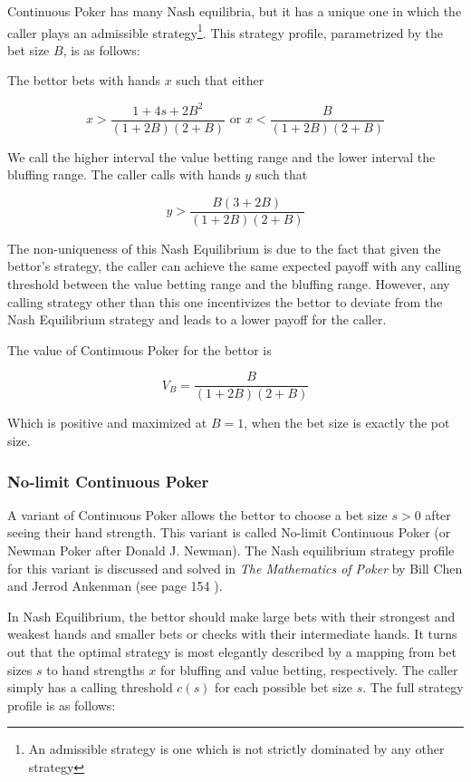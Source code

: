 \documentclass[a4paper,12pt]{article}
\theoremstyle{plain}
\theoremstyle{definition}
\begin{document}
Continuous Poker has many Nash equilibria, but it has a unique one in which the caller plays an admissible strategy\footnote{An admissible strategy is one which is not strictly dominated by any other strategy}. This strategy profile, parametrized by the bet size $B$, is as follows:

The bettor bets with hands $x$ such that either 

$$x > \frac{1 + 4s + 2B^2}{(1+2B)(2+B)} \text{ or } x < \frac{B}{(1+2B)(2+B)}$$

We call the higher interval the value betting range and the lower interval the bluffing range. The caller calls with hands $y$ such that

$$ y > \frac{B(3 +2B)}{(1+2B)(2+B)} $$

The non-uniqueness of this Nash Equilibrium is due to the fact that given the bettor's strategy, the caller can achieve the same expected payoff with any calling threshold between the value betting range and the bluffing range. However, any calling strategy other than this one incentivizes the bettor to deviate from the Nash Equilibrium strategy and leads to a lower payoff for the caller. 

The value of Continuous Poker for the bettor is 

$$ V_B = \frac{B}{(1+2B)(2+B)} $$

Which is positive and maximized at $B = 1$, when the bet size is exactly the pot size. 

\subsubsection{No-limit Continuous Poker}
A variant of Continuous Poker allows the bettor to choose a bet size $s > 0$ after seeing their hand strength. This variant is called No-limit Continuous Poker (or Newman Poker after Donald J. Newman). The Nash equilibrium strategy profile for this variant is discussed and solved in \textit{The Mathematics of Poker} by Bill Chen and Jerrod Ankenman (see page 154 ). 

In Nash Equilibrium, the bettor should make large bets with their strongest and weakest hands and smaller bets or checks with their intermediate hands. It turns out that the optimal strategy is most elegantly described by a mapping from bet sizes $s$ to hand strengths $x$ for bluffing and value betting, respectively. The caller simply has a calling threshold $c(s)$ for each possible bet size $s$. The full strategy profile is as follows:
\end{document}
